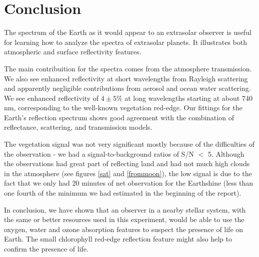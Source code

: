 \section{Conclusion}


The spectrum of the Earth as it would appear to an extrasolar observer is useful
for learning how to analyze the spectra of extrasolar planets. It 
illustrates both atmospheric and surface reflectivity features. 

The main contribuition for the spectra comes from the atmosphere transmission.
We also see enhanced reflectivity at short wavelengths from Rayleigh scattering
and
apparently negligible contributions from aerosol and ocean water scattering.  We
 see enhanced reflectivity of $4\pm 5\%$ at long wavelengths starting at
about
740 nm,
corresponding to the well-known vegetation red-edge. Our fittings for the
Earth's reflection spectrum shows good agreement with the combination of
reflectance, scattering, and transmission models.

The vegetation signal was not very 
significant mostly because of  the difficulties of the observation - we had a
signal-to-background ratios of  S/N $<$ 5. Although the observations
had great part of reflecting land  and had not much high
clouds in the atmosphere (see figures \ref{sat} and \ref{frommoon}), the low
signal is due to the fact that we only had 20 minutes of net observation for the
Earthshine (less than one fourth of the minimum we had estimated in
the beginning of the report).


In conclusion, we have shown that an observer in a nearby stellar
system, with the same or better resources used in this experiment, would be able
to use the oxygen, water and ozone absorption features to suspect the presence
of life on
Earth. The small chlorophyll
red-edge reflection feature might also help to confirm the presence of life.
